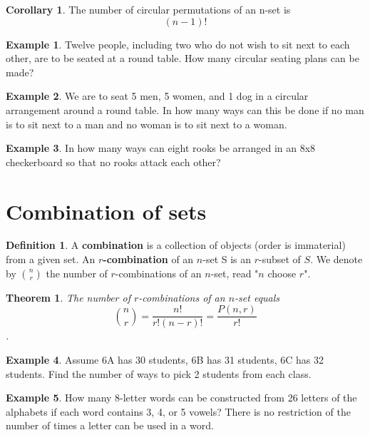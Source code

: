 \documentclass[addpoints]{exam}
\newtheorem{theorem}{Theorem}[section]
\theoremstyle{definition}
\newtheorem{corollary}{Corollary}[theorem]
\newtheorem{defn}{Definition}[section]
\newtheorem{exmp}{Example}[section]
\begin{document}
\begin{corollary}
	The number of circular permutations of an n-set is 
	\begin{equation*}
		(n - 1)!
	\end{equation*}
\end{corollary}

\begin{exmp}
	Twelve people, including two who do not wish to sit next to each other, are to be seated at a round table. How many circular seating plans can be made?	
\end{exmp}

\begin{exmp}
	We are to seat 5 men, 5 women, and 1 dog in a circular arrangement around a round table. In how many ways can this be done if no man is to sit next to a man and no woman is to sit next to a woman.
\end{exmp}

\begin{exmp}
	In how many ways can eight rooks be arranged in an 8x8 checkerboard so that no rooks attack each other?
\end{exmp}

\section{Combination of sets}
\begin{defn}
A \textbf{combination} is a collection of objects (order is immaterial) from a given set. An \textbf{$r$-combination} of an $n$-set S is an $r$-subset of $S$. We denote by $\binom{n}{r}$ the number of $r$-combinations of an $n$-set, read "$n$ choose $r$".
\end{defn}

\begin{theorem}
	The number of $r$-combinations of an $n$-set equals
	\begin{equation*}
		\binom{n}{r} = \frac{n!}{r!(n-r)!} = \frac{P(n, r)}{r!}
	\end{equation*}.
\end{theorem}

\begin{exmp}
	Assume 6A has 30 students, 6B has 31 students, 6C has 32 students. Find the number of ways to pick 2 students from each class.
\end{exmp}

\begin{exmp}
	How many 8-letter words can be constructed from 26 letters of the alphabets if each word contains 3, 4, or 5 vowels? There is no restriction of the number of times a letter can be used in a word.	
\end{exmp}
\end{document}
